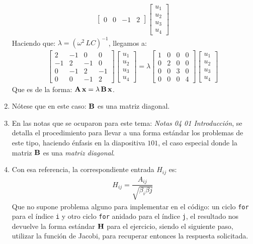 \begin{enumerate}
\begin{align*}
\begin{bmatrix}
0 & 0 & -1 & 2
\end{bmatrix}
\begin{bmatrix}
u_{1} \\
u_{2} \\
u_{3} \\
u_{4}
\end{bmatrix}
\end{align*}
Haciendo que: $\lambda = (\omega^{2} \, L C)^{-1}$, llegamos a:
\begin{align*}
\begin{bmatrix}
2 & -1 & 0 & 0 \\
-1 & 2 & -1 & 0 \\
0 & -1 & 2 & -1 \\
0 & 0 & -1 & 2
\end{bmatrix}
\begin{bmatrix}
u_{1} \\
u_{2} \\
u_{3} \\
u_{4}
\end{bmatrix} = \lambda
\begin{bmatrix}
1 & 0 & 0 & 0 \\
0 & 2 & 0 & 0 \\
0 & 0 & 3 & 0 \\
0 & 0 & 0 & 4
\end{bmatrix}
\begin{bmatrix}
u_{1} \\
u_{2} \\
u_{3} \\
u_{4}
\end{bmatrix}
\end{align*}
Que es de la forma: $\vb{A \, x} = \lambda \, \vb{B \, x}$.
\item Nótese que en este caso: $\vb{B}$ es una matriz diagonal.
\item En las notas que se ocuparon para este tema: \emph{Notas 04 01 Introducción}, se detalla el procedimiento para llevar a una forma estándar los problemas de este tipo, haciendo énfasis en la diapositiva $101$, el caso especial donde la matriz $\vb{B}$ es una \emph{matriz diagonal}.
\item Con esa referencia, la correspondiente entrada $H_{ij}$ es:
\begin{align*}
H_{ij} = \dfrac{A_{ij}}{\sqrt{\beta_{i} \beta{j}}}
\end{align*}
Que no supone problema alguno para implementar en el código: un ciclo \texttt{for} para el índice \texttt{i} y otro ciclo \texttt{for} anidado para el índice \texttt{j}, el resultado nos devuelve la forma estándar $\vb{H}$ para el ejercicio, siendo el siguiente paso, utilizar la función de Jacobi, para recuperar entonces la respuesta solicitada.

\end{enumerate}
